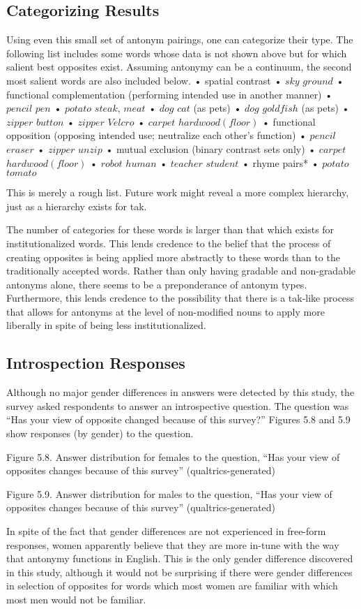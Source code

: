 \subsection {Categorizing Results} Using even this small set of antonym pairings, one can categorize their type.  The following list includes some words whose data is not shown above but for which salient best opposites exist.  Assuming antonymy can be a continuum, the second most salient words are also included below.
	•	spatial contrast
	•	$sky$ \opp $ground$
	•	functional complementation (performing intended use in another manner) 
	•	$pencil$ \opp $pen$
	•	$potato$ \opp $steak$, $meat$
	•	$dog$ \opp $cat$ (as pets)
	•	$dog$ \opp $goldfish$ (as pets)
	•	$zipper$ \opp $button$
	•	$zipper$ \opp $Velcro$
	•	$carpet$ \opp $hardwood (floor)$
	•	functional opposition (opposing intended use; neutralize each other’s function) 
	•	$pencil$ \opp $eraser$
	•	$zipper$ \opp $unzip$
	•	mutual exclusion (binary contrast sets only)
	•	$carpet$ \opp $hardwood (floor)$
	•	$robot$ \opp $human$
	•	$teacher$ \opp $student$
	•	rhyme pairs*
	•	$potato$ \opp $tomato$

This is merely a rough list.  Future work might reveal a more complex hierarchy, just as a hierarchy exists for tak.  

The number of categories for these words is larger than that which exists for institutionalized words.  This lends credence to the belief that the process of creating opposites is being applied more abstractly to these words than to the traditionally accepted words. Rather than only having gradable and non-gradable antonyms alone, there seems to be a preponderance of antonym types.  Furthermore, this lends credence to the possibility that there is a tak-like process that allows for antonyms at the level of non-modified nouns to apply more liberally in spite of being less institutionalized.

\subsection {Introspection Responses} Although no major gender differences in answers were detected by this study, the survey asked respondents to answer an introspective question.  The question was “Has your view of opposite changed because of this survey?”  Figures 5.8 and 5.9 show responses (by gender) to the question.  

Figure 5.8. Answer distribution for females to the question, “Has your view of opposites changes because of this survey” (qualtrics-generated)

  Figure 5.9. Answer distribution for males to the question, “Has your view of opposites changes because of this survey” (qualtrics-generated)

In spite of the fact that gender differences are not experienced in free-form responses, women apparently believe that they are more in-tune with the way that antonymy functions in English.  This is the only gender difference discovered in this study, although it would not be surprising if there were gender differences in selection of opposites for words which most women are familiar with which most men would not be familiar.